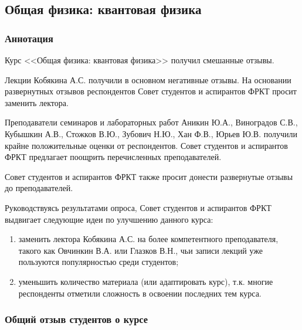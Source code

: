    \subsection{Общая физика: квантовая физика}
        
        \subsubsection{Аннотация}

            Курс <<Общая физика: квантовая физика>> получил смешанные отзывы.

            Лекции Кобякина А.С. получили в основном негативные отзывы. На основании развернутных отзывов респондентов Совет студентов и аспирантов ФРКТ просит заменить лектора.

            Преподаватели семинаров и лабораторных работ Аникин Ю.А., Виноградов С.В., Кубышкин А.В., Стожков В.Ю., Зубович Н.Ю., Хан Ф.В., Юрьев Ю.В. получили крайне положительные оценки от респондентов. Совет студентов и аспирантов ФРКТ предлагает поощрить перечисленных преподавателей.

            Совет студентов и аспирантов ФРКТ также просит донести развернутые отзывы до преподавателей.

            Руководствуясь результатами опроса, Совет студентов и аспирантов ФРКТ выдвигает следующие идеи по улучшению данного курса:
	        \begin{enumerate}
                \item заменить лектора Кобякина А.С. на более компетентного преподавателя, такого как Овчинкин В.А. или Глазков В.Н., чьи записи лекций уже пользуются популярностью среди студентов;
                \item уменьшить количество материала (или адаптировать курс), т.к. многие респонденты отметили сложность в освоении последних тем курса.
            \end{enumerate}

        \subsubsection{Общий отзыв студентов о курсе}


